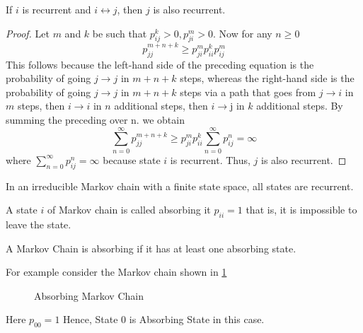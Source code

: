 \begin{theorem}[]
    \label{recurent if communicate}
    If $ i $ is recurrent and $ i\longleftrightarrow j $, then  $ j $ is also recurrent.
\end{theorem}
\begin{proof}
    Let $ m $ and  $ k $ be such that  $ p^{k}_{ij}>0,p^{m}_{ji}>0 $. Now for any $ n\ge 0 $
    \[
        p^{m+n+k}_{jj}\ge p^{m}_{ji}p^{k}_{ii}p^{m}_{ij}
    \]
    This follows because the left-hand side of the preceding equation is the probability of going $j \to j$ in $m+n+k$ steps,
      whereas the right-hand side is the probability of going $j \to j$ in $m+n+k$ steps
      via a path that goes from $j \to i$ in $m$ steps, then $i \to i$ in $n$ additional steps,
      then $i \to $j in $k$ additional steps. By summing the preceding over n. we obtain
    \[
        \sum_{n=0}^{\infty} p^{m+n+k}_{jj}\ge p^{m}_{ji}p^{k}_{ii} \sum_{n=0}^{\infty}  p^{n}_{ij} = \infty
    \]
     where $ \sum_{n=0}^{\infty}  p^{n}_{ij} = \infty $ because state $ i $ is recurrent. Thus, $j$ is also recurrent.
\end{proof}

\begin{proposition}
     In an irreducible Markov chain with a finite state space, all states are recurrent.
\end{proposition}

\begin{definition}
    A state $ i $ of Markov chain is called absorbing it  $ p_{ii} = 1 $ that is, it is impossible to leave 
    the state. 
\end{definition}

A Markov Chain is absorbing if it has at least one absorbing state.

For example consider the Markov chain shown in \cref{Absorving markov chain}

\begin{figure}[H]
    \centering
    \centering
    \caption{Absorbing Markov Chain}
    \label{Absorving markov chain}
\end{figure}

Here $p_00=1$ Hence, State 0 is Absorbing State in this case.
